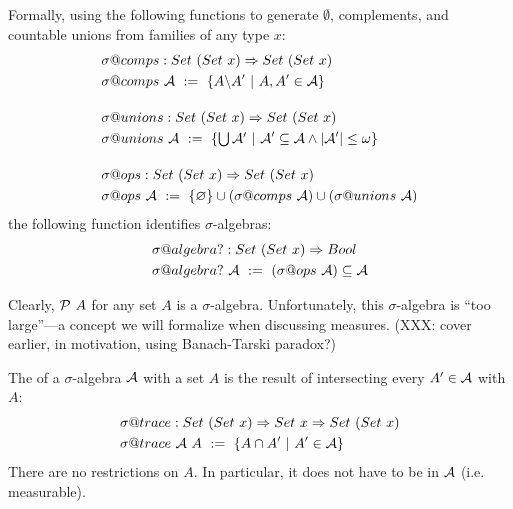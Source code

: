 \documentclass[preprint]{sigplanconf}
\begin{document}
Formally, using the following functions to generate $\emptyset$, complements, and countable unions from families of any type $x$:
\begin{align}
	&\begin{aligned}
		&\sigma@comps : Set~(Set~x) \tto Set~(Set~x) \\
		&\sigma@comps~\A \ := \ \setb{A \w A'}{A, A' \in \A} \\
	\end{aligned} \\
\nonumber \\[-6pt]
	&\begin{aligned}
		&\sigma@unions : Set~(Set~x) \tto Set~(Set~x) \\
		&\sigma@unions~\A \ := \ \setb{\U\A'}{\A' \subseteq \A \band |\A'| \leq \omega} \\
	\end{aligned} \\
\nonumber \\[-6pt]
	&\begin{aligned}
		&\sigma@ops : Set~(Set~x) \tto Set~(Set~x) \\
		&\sigma@ops~\A \ := \ \set{\emptyset} \u (\sigma@comps~\A) \u (\sigma@unions~\A) \\
	\end{aligned}
\end{align}
the following function identifies $\sigma$-algebras:
\begin{equation}
\begin{aligned}
	&\sigma@algebra? : Set~(Set~x) \tto Bool \\
	&\sigma@algebra?~\A \ := \ (\sigma@ops~\A) \subseteq \A
\end{aligned}
\end{equation}

Clearly, $\mathcal{P}~A$ for any set $A$ is a $\sigma$-algebra.
Unfortunately, this $\sigma$-algebra is ``too large''---a concept we will formalize when discussing measures.
(XXX: cover earlier, in motivation, using Banach-Tarski paradox?)

The  of a $\sigma$-algebra $\mathcal{A}$ with a set $A$ is the result of intersecting every $A' \in \mathcal{A}$ with $A$:
\begin{equation}
\begin{aligned}
	&\sigma@trace : Set~(Set~x) \tto Set~x \tto Set~(Set~x) \\
	&\sigma@trace~\A~A \ := \ \setb{A \i A'}{A' \in \A}
\end{aligned}
\end{equation}
There are no restrictions on $A$.
In particular, it does not have to be in $\mathcal{A}$ (i.e. measurable).
\end{document}
